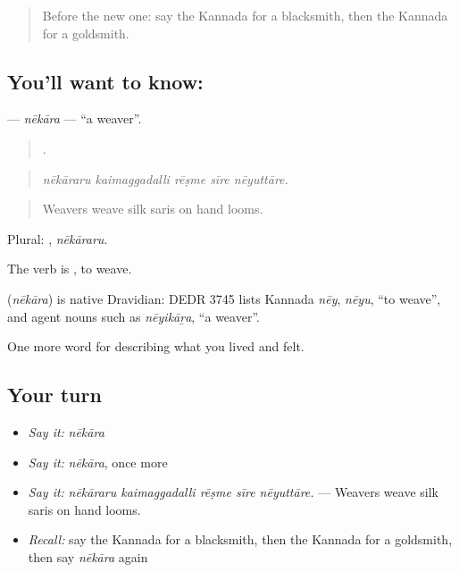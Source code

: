 \label{lesson:KA-C522-nekara}



\begin{quote}
Before the new one: say the Kannada for a blacksmith, then the Kannada for a goldsmith.
\end{quote}

\subsection*{You'll want to know: }
\textbf{} — \emph{nēkāra} — \textquotedblleft{}a weaver\textquotedblright{}.

\begin{quote}
    .
\end{quote}

\begin{quote}
\emph{nēkāraru kaimaggadalli rēṣme sīre nēyuttāre.}
\end{quote}

\begin{quote}
Weavers weave silk saris on hand looms.
\end{quote}

Plural: , \emph{nēkāraru}.

The verb is , to weave.

\begin{cousinweb}
\textbf{} (\emph{nēkāra}) is native Dravidian: DEDR 3745 lists Kannada \emph{nēy}, \emph{nēyu}, \textquotedblleft{}to weave\textquotedblright{}, and agent nouns such as \emph{nēyikāṟa}, \textquotedblleft{}a weaver\textquotedblright{}.
\end{cousinweb}

\begin{grammarlens}[title={What you've built}]
One more word for describing what you lived and felt.
\end{grammarlens}

\subsection*{Your turn}
\begin{itemize}
\raggedright
  \item \emph{Say it:} \emph{nēkāra}
  \item \emph{Say it:} \emph{nēkāra}, once more
  \item \emph{Say it:} \emph{nēkāraru kaimaggadalli rēṣme sīre nēyuttāre.} — Weavers weave silk saris on hand looms.
  \item \emph{Recall:} say the Kannada for a blacksmith, then the Kannada for a goldsmith, then say \emph{nēkāra} again
\end{itemize}

